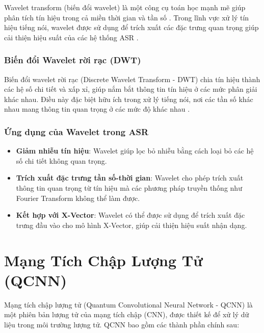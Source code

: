 \documentclass{article}
\begin{document}
Wavelet transform (biến đổi wavelet) là một công cụ toán học mạnh mẽ giúp phân tích tín hiệu trong cả miền thời gian và tần số \cite{daubechies1992ten}. Trong lĩnh vực xử lý tín hiệu tiếng nói, wavelet được sử dụng để trích xuất các đặc trưng quan trọng giúp cải thiện hiệu suất của các hệ thống ASR \cite{mallat1999wavelet}.

\subsubsection{Biến đổi Wavelet rời rạc (DWT)}

Biến đổi wavelet rời rạc (Discrete Wavelet Transform - DWT) chia tín hiệu thành các hệ số chi tiết và xấp xỉ, giúp nắm bắt thông tin tín hiệu ở các mức phân giải khác nhau. Điều này đặc biệt hữu ích trong xử lý tiếng nói, nơi các tần số khác nhau mang thông tin quan trọng ở các mức độ khác nhau \cite{coifman1995wavelet}.

\subsubsection{Ứng dụng của Wavelet trong ASR}

\begin{itemize}
    \item \textbf{Giảm nhiễu tín hiệu}: Wavelet giúp lọc bỏ nhiễu bằng cách loại bỏ các hệ số chi tiết không quan trọng.
    \item \textbf{Trích xuất đặc trưng tần số-thời gian}: Wavelet cho phép trích xuất thông tin quan trọng từ tín hiệu mà các phương pháp truyền thống như Fourier Transform không thể làm được.
    \item \textbf{Kết hợp với X-Vector}: Wavelet có thể được sử dụng để trích xuất đặc trưng đầu vào cho mô hình X-Vector, giúp cải thiện hiệu suất nhận dạng.
\end{itemize}

\section{Mạng Tích Chập Lượng Tử (QCNN)}

Mạng tích chập lượng tử (Quantum Convolutional Neural Network - QCNN) là một phiên bản lượng tử của mạng tích chập (CNN), được thiết kế để xử lý dữ liệu trong môi trường lượng tử. QCNN bao gồm các thành phần chính sau:
\end{document}
